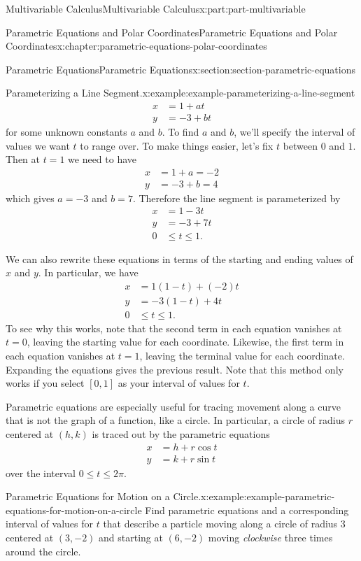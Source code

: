 \documentclass[twoside,10pt,]{book}
\numberwithin{equation}{part}
\newcommand{\amp}{&}
\begin{document}
\begin{partptx}{Multivariable Calculus}{}{Multivariable Calculus}{}{}{x:part:part-multivariable}
\begin{chapterptx}{Parametric Equations and Polar Coordinates}{}{Parametric Equations and Polar Coordinates}{}{}{x:chapter:parametric-equations-polar-coordinates}
\begin{sectionptx}{Parametric Equations}{}{Parametric Equations}{}{}{x:section:section-parametric-equations}
\begin{example}{Parameterizing a Line Segment.}{x:example:example-parameterizing-a-line-segment}
\begin{align*}
x \amp = 1 + at \\
y \amp = -3 + bt 
\end{align*}
for some unknown constants \(a\) and \(b\). To find \(a\) and \(b\), we'll specify the interval of values we want \(t\) to range over. To make things easier, let's fix \(t\) between \(0\) and \(1\). Then at \(t = 1\) we need to have%
\begin{align*}
x \amp = 1 + a = -2 \\
y \amp = -3 + b = 4 
\end{align*}
which gives \(a = -3\) and \(b = 7\). Therefore the line segment is parameterized by%
\begin{align*}
x \amp = 1 - 3t \\
y \amp = -3 + 7t \\
0 \amp \leq t\leq 1 \text{.}
\end{align*}
%
\par
We can also rewrite these equations in terms of the starting and ending values of \(x\) and \(y\). In particular, we have%
\begin{align*}
x \amp = 1(1 - t) + (-2)t \\
y \amp = -3(1 - t) + 4t \\
0 \amp \leq t\leq 1 \text{.}
\end{align*}
To see why this works, note that the second term in each equation vanishes at \(t = 0\), leaving the starting value for each coordinate. Likewise, the first term in each equation vanishes at \(t = 1\), leaving the terminal value for each coordinate. Expanding the equations gives the previous result. Note that this method only works if you select \([0,1]\) as your interval of values for \(t\).%
\end{example}
Parametric equations are especially useful for tracing movement along a curve that is not the graph of a function, like a circle. In particular, a circle of radius \(r\) centered at \((h,k)\) is traced out by the parametric equations%
\begin{align*}
x \amp = h + r\cos t \\
y \amp = k + r\sin t 
\end{align*}
over the interval \(0\leq t\leq 2\pi\).%
\begin{example}{Parametric Equations for Motion on a Circle.}{x:example:example-parametric-equations-for-motion-on-a-circle}%
Find parametric equations and a corresponding interval of values for \(t\) that describe a particle moving along a circle of radius \(3\) centered at \((3,-2)\) and starting at \((6,-2)\) moving \emph{clockwise} three times around the circle.%

\end{example}
\end{sectionptx}
\end{chapterptx}
\end{partptx}
\end{document}
